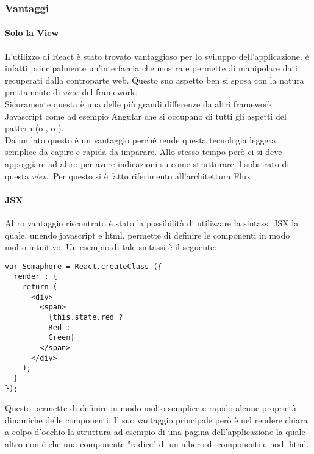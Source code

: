\subsubsection{Vantaggi}

\paragraph{Solo la View}\label{just-the-view}
L'utilizzo di React è stato trovato vantaggioso per lo sviluppo dell'applicazione.
\fiscoloMobile{} è infatti principalmente un'interfaccia che mostra e permette di
manipolare dati recuperati dalla controparte web. Questo suo aspetto ben si sposa
con la natura prettamente di \textit{view} del framework. \\

Sicuramente questa è una delle più grandi differenze da altri framework Javascript
come ad esempio Angular che si occupano di tutti gli aspetti del pattern 
(o , o ). \\

Da un lato questo è un vantaggio perché rende questa tecnologia leggera, semplice da
capire e rapida da imparare. Allo stesso tempo però ci si deve appoggiare ad altro
per avere indicazioni su come strutturare il substrato di questa \textit{view}. Per
questo si è fatto riferimento all'architettura Flux. \\

\paragraph{JSX}
Altro vantaggio riscontrato è stato la possibilità di utilizzare la sintassi JSX
la quale, unendo javascript e html, permette di definire le componenti in modo molto
intuitivo. Un esempio di tale sintassi è il seguente:

\begin{verbatim}
var Semaphore = React.createClass ({
  render : {
    return (
      <div>
        <span>
          {this.state.red ?
          Red :
          Green}
        </span>
      </div>	
    );
  }
});
\end{verbatim}

Questo permette di definire in modo molto semplice e rapido alcune proprietà dinamiche
delle componenti. Il suo vantaggio principale però è nel rendere chiara a colpo d'occhio
la struttura ad esempio di una pagina dell'applicazione la quale altro non è che una
componente "radice" di un albero di componenti e nodi html.

